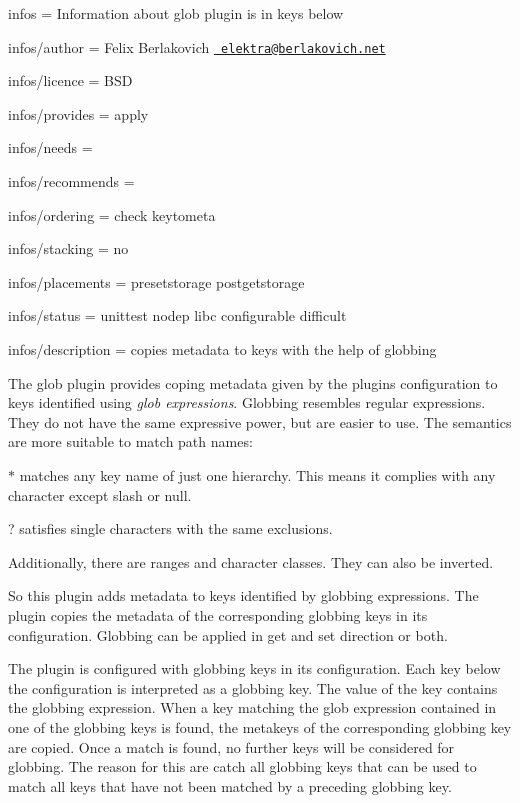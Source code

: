 
\begin{DoxyItemize}
\item infos = Information about glob plugin is in keys below
\item infos/author = Felix Berlakovich \href{mailto:elektra@berlakovich.net}{\texttt{ elektra@berlakovich.\+net}}
\item infos/licence = B\+SD
\item infos/provides = apply
\item infos/needs =
\item infos/recommends =
\item infos/ordering = check keytometa
\item infos/stacking = no
\item infos/placements = presetstorage postgetstorage
\item infos/status = unittest nodep libc configurable difficult
\item infos/description = copies metadata to keys with the help of globbing
\end{DoxyItemize}

The glob plugin provides coping metadata given by the plugin\textquotesingle{}s configuration to keys identified using {\itshape glob expressions}. Globbing resembles regular expressions. They do not have the same expressive power, but are easier to use. The semantics are more suitable to match path names\+:


\begin{DoxyItemize}
\item {\ttfamily $\ast$} matches any key name of just one hierarchy. This means it complies with any character except slash or null.
\item {\ttfamily ?} satisfies single characters with the same exclusions.
\item Additionally, there are ranges and character classes. They can also be inverted.
\end{DoxyItemize}

So this plugin adds metadata to keys identified by globbing expressions. The plugin copies the metadata of the corresponding globbing keys in its configuration. Globbing can be applied in get and set direction or both.

The plugin is configured with globbing keys in its configuration. Each key below the configuration is interpreted as a globbing key. The value of the key contains the globbing expression. When a key matching the glob expression contained in one of the globbing keys is found, the metakeys of the corresponding globbing key are copied. Once a match is found, no further keys will be considered for globbing. The reason for this are catch all globbing keys that can be used to match all keys that have not been matched by a preceding globbing key.


